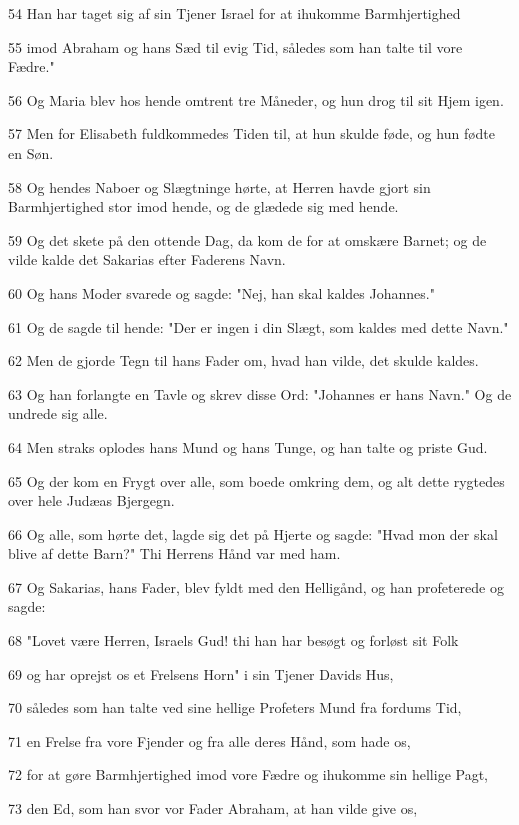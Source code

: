 \par 54 Han har taget sig af sin Tjener Israel for at ihukomme Barmhjertighed
\par 55 imod Abraham og hans Sæd til evig Tid, således som han talte til vore Fædre."
\par 56 Og Maria blev hos hende omtrent tre Måneder, og hun drog til sit Hjem igen.
\par 57 Men for Elisabeth fuldkommedes Tiden til, at hun skulde føde, og hun fødte en Søn.
\par 58 Og hendes Naboer og Slægtninge hørte, at Herren havde gjort sin Barmhjertighed stor imod hende, og de glædede sig med hende.
\par 59 Og det skete på den ottende Dag, da kom de for at omskære Barnet; og de vilde kalde det Sakarias efter Faderens Navn.
\par 60 Og hans Moder svarede og sagde: "Nej, han skal kaldes Johannes."
\par 61 Og de sagde til hende: "Der er ingen i din Slægt, som kaldes med dette Navn."
\par 62 Men de gjorde Tegn til hans Fader om, hvad han vilde, det skulde kaldes.
\par 63 Og han forlangte en Tavle og skrev disse Ord: "Johannes er hans Navn." Og de undrede sig alle.
\par 64 Men straks oplodes hans Mund og hans Tunge, og han talte og priste Gud.
\par 65 Og der kom en Frygt over alle, som boede omkring dem, og alt dette rygtedes over hele Judæas Bjergegn.
\par 66 Og alle, som hørte det, lagde sig det på Hjerte og sagde: "Hvad mon der skal blive af dette Barn?" Thi Herrens Hånd var med ham.
\par 67 Og Sakarias, hans Fader, blev fyldt med den Helligånd, og han profeterede og sagde:
\par 68 "Lovet være Herren, Israels Gud! thi han har besøgt og forløst sit Folk
\par 69 og har oprejst os et Frelsens Horn" i sin Tjener Davids Hus,
\par 70 således som han talte ved sine hellige Profeters Mund fra fordums Tid,
\par 71 en Frelse fra vore Fjender og fra alle deres Hånd, som hade os,
\par 72 for at gøre Barmhjertighed imod vore Fædre og ihukomme sin hellige Pagt,
\par 73 den Ed, som han svor vor Fader Abraham, at han vilde give os,
